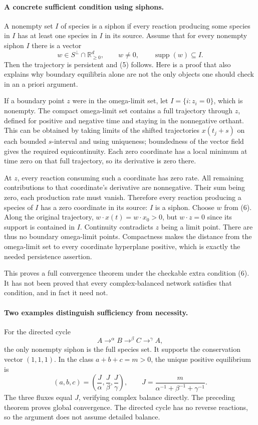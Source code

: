 \documentclass[11pt]{article}
\begin{document}
\paragraph{A concrete sufficient condition using siphons.}
A nonempty set $I$ of species is a siphon if every reaction producing
some species in $I$ has at least one species in $I$ in its source.
Assume that for every nonempty siphon $I$ there is a vector
\[
 w\in S^\perp\cap\mathbb R_{\ge0}^d,
 \qquad w\ne0,\qquad \operatorname{supp}(w)\subseteq I.  \tag{6}
\]
Then the trajectory is persistent and (5) follows. Here is a proof
that also explains why boundary equilibria alone are not the only
objects one should check in an a priori argument.

If a boundary point $z$ were in the omega-limit set, let
$I=\{i:z_i=0\}$, which is nonempty. The compact omega-limit set
contains a full trajectory through $z$, defined for positive and
negative time and staying in the nonnegative orthant. This can be
obtained by taking limits of the shifted trajectories $x(t_j+s)$
on each bounded $s$-interval and using uniqueness; boundedness of the
vector field gives the required equicontinuity.
Each zero coordinate has a local minimum at time zero on that full
trajectory, so its derivative is zero there.

At $z$, every reaction consuming such a coordinate has zero rate.
All remaining contributions to that coordinate's derivative are
nonnegative. Their sum being zero, each production rate must vanish.
Therefore every reaction producing a species of $I$ has a zero
coordinate in its source: $I$ is a siphon.
Choose $w$ from (6). Along the original trajectory,
$w\cdot x(t)=w\cdot x_0>0$, but $w\cdot z=0$ since its support is
contained in $I$. Continuity contradicts $z$ being a limit point.
There are thus no boundary omega-limit points. Compactness makes the
distance from the omega-limit set to every coordinate hyperplane
positive, which is exactly the needed persistence assertion.

This proves a full convergence theorem under the checkable extra
condition (6). It has not been proved that every complex-balanced
network satisfies that condition, and in fact it need not.

\paragraph{Two examples distinguish sufficiency from necessity.}
For the directed cycle
\[
              A\mathrel{\mathop{\longrightarrow}^{\alpha}}B
              \mathrel{\mathop{\longrightarrow}^{\beta}}C
              \mathrel{\mathop{\longrightarrow}^{\gamma}}A,
\]
the only nonempty siphon is the full species set. It supports the
conservation vector $(1,1,1)$. In the class $a+b+c=m>0$, the unique
positive equilibrium is
\[
 (a,b,c)=\left(\frac J\alpha,\frac J\beta,\frac J\gamma\right),
 \qquad J=\frac m{\alpha^{-1}+\beta^{-1}+\gamma^{-1}}.
\]
The three fluxes equal $J$, verifying complex balance directly.
The preceding theorem proves global convergence. The directed cycle
has no reverse reactions, so the argument does not assume detailed
balance.
\end{document}
